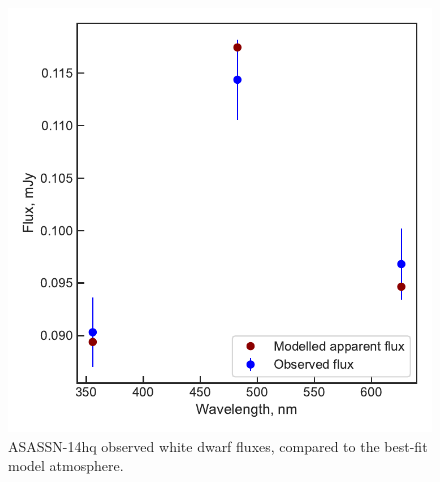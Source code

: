 \begin{figure}
    \centering
    \includegraphics[width=\textwidth]{figures/results/ASASSN-14hq/fluxplot.pdf}
    \caption{ASASSN-14hq observed white dwarf fluxes, compared to the best-fit model atmosphere.}
    \label{fig:ASASSN-14hq flux plot}
\end{figure}
\clearpage

